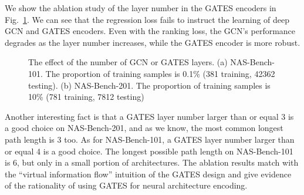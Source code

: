 \documentclass[runningheads]{llncs}
\begin{document}
We show the ablation study of the layer number in the GATES encoders in Fig.~\ref{fig:gates_layers}. We can see that the regression loss fails to instruct the learning of deep GCN and GATES encoders. Even with the ranking loss, the GCN's performance degrades as the layer number increases, while the GATES encoder is more robust.


\begin{figure}[tb]
  \vspace{-5pt}
  \begin{center}
  \vspace{-5pt}
  \caption{The  effect of the number of GCN or GATES layers. (a) NAS-Bench-101. The proportion of training samples is 0.1\% (381 training, 42362 testing). (b) NAS-Bench-201. The proportion of training samples is 10\% (781 training, 7812 testing)}
  \label{fig:gates_layers}
\end{center}

\end{figure}

Another interesting fact is that
a GATES layer number larger than or equal 3 is a good choice on NAS-Bench-201, and as we know, the most common longest path length is 3 too. 
As for NAS-Bench-101, a GATES layer number larger than or equal 4  is a good choice. The longest possible path length on NAS-Bench-101 is 6, but only in a small portion of architectures.
The ablation results match with the ``virtual information flow'' intuition of the GATES design and give evidence of the rationality of using GATES for neural architecture encoding.
\end{document}
